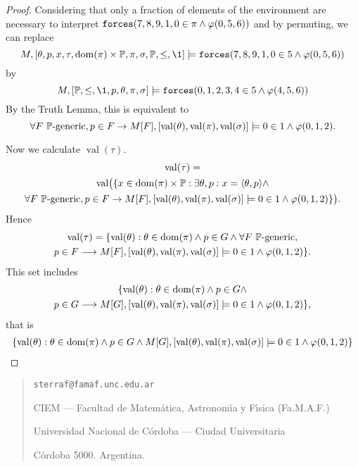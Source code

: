 \documentclass[11pt,english]{article}
\renewcommand{\PP}{\mathbb{P}}
\newcommand{\forceisa}{\mathtt{forces}}
\DeclareMathOperator{\val}{val}
\begin{document}
\begin{proof}
  Considering that only a fraction of elements
  of the environment  are necessary to interpret
  $\forceisa(7,8,9,1,0\in\pi\y\phi(0,5,6))$ and by permuting, we can
  replace
  \[
  M, [\th,p,x,\tau,\dom(\pi)\times\PP,\pi,\sig,\PP,\leq,\1]\models
  \forceisa(7,8,9,1,0\in 5 \y\phi(0,5,6))
  \]
  by
  \[
  M,[\PP,\leq,\1,p,\th,\pi,\sig]\models
  \forceisa(0,1,2,3,4\in 5 \y\phi(4,5,6))
  \]
  By the Truth Lemma, this is equivalent to
  \[
  \forall F\ \PP\text{-generic}, p\in F \limp
  M[F],[\val(\th),\val(\pi),\val(\sig)]\models
  0\in1  \y\phi(0,1,2).
  \]

  Now we calculate $\val(\tau)$.
  \begin{multline*}
    \val(\tau) = \\
    \val\bigl(\{x\in\dom(\pi)\times\PP : \exists \th,p : x =\lb\th,p\rb
    \y  \\
    \forall F\ \PP\text{-generic}, p\in F \limp
    M[F],[\val(\th),\val(\pi),\val(\sig)]\models
    0\in 1 \y\phi(0,1,2)\}\bigr).
  \end{multline*}
  Hence
  \begin{multline*}
    \val(\tau) = 
    \{\val(\th): \th\in\dom(\pi) \y  p \in G 
    \y \forall F\ \PP\text{-generic}, \\
   p\in F \longrightarrow
  M[F],[\val(\th),\val(\pi),\val(\sig)]\models
  0\in 1 \y\phi(0,1,2)\}.
  \end{multline*}
  This set includes
  \begin{multline*}
    \{\val(\th): \th\in\dom(\pi) \y  p \in G 
    \y  \\
   p\in G \longrightarrow
   M[G],[\val(\th),\val(\pi),\val(\sig)]\models
   0\in 1 \y\phi(0,1,2)\},
  \end{multline*}
  that is
  \begin{multline*}
    \{\val(\th): \th\in\dom(\pi) \y  p \in G 
    \y 
   M[G],[\val(\th),\val(\pi),\val(\sig)]\models
   0\in 1 \y\phi(0,1,2)\}
  \end{multline*}
\end{proof}





\bigskip

\begin{small}
  \begin{quote}
    \texttt{sterraf@famaf.unc.edu.ar}
    
    CIEM --- Facultad de Matem\'atica, Astronom\'{\i}a y F\'{\i}sica 
    (Fa.M.A.F.) 
    
    Universidad Nacional de C\'ordoba --- Ciudad Universitaria
    
    C\'ordoba 5000. Argentina.
  \end{quote}
\end{small}
\end{document}
